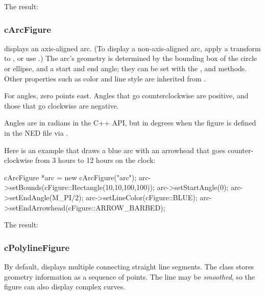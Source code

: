 The result:

\begin{center}

\end{center}


\subsubsection{cArcFigure}
\label{sec:graphics:arcfigure}

 displays an axis-aligned arc. (To display a
non-axis-aligned arc, apply a transform to , or use
.) The arc's geometry is determined by the bounding box
of the circle or ellipse, and a start and end angle; they can be set with
the ,  and 
methods. Other properties such as color and line style are inherited from
.

For angles, zero points east. Angles that go counterclockwise are
positive, and those that go clockwise are negative.

\begin{note}
Angles are in radians in the C++ API, but in degrees when the figure is
defined in the NED file via .
\end{note}

Here is an example that draws a blue arc with an arrowhead that goes
counter-clockwise from 3 hours to 12 hours on the clock:

\begin{cpp}
cArcFigure *arc = new cArcFigure("arc");
arc->setBounds(cFigure::Rectangle(10,10,100,100));
arc->setStartAngle(0);
arc->setEndAngle(M_PI/2);
arc->setLineColor(cFigure::BLUE);
arc->setEndArrowhead(cFigure::ARROW_BARBED);
\end{cpp}


The result:

\begin{center}

\end{center}


\subsubsection{cPolylineFigure}
\label{sec:graphics:polylinefigure}

By default,  displays multiple connecting straight
line segments. The class stores geometry information as a sequence of
points. The line may be \textit{smoothed}, so the figure can also display
complex curves.

